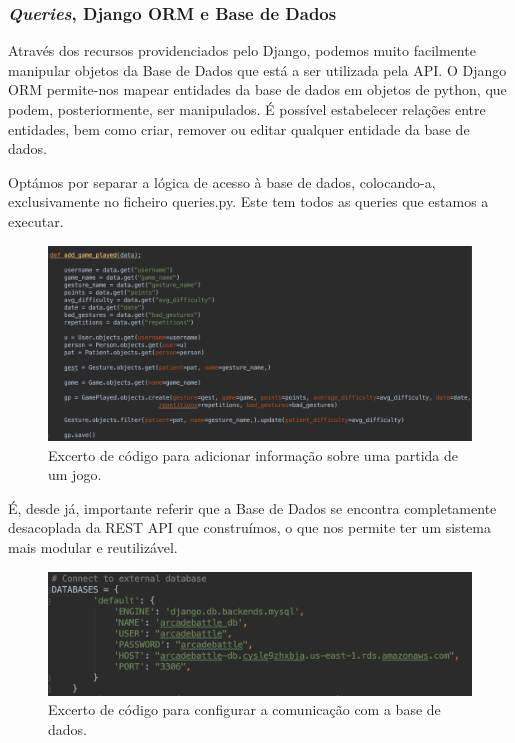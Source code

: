 \documentclass{TTUPhD}
\begin{document}
\subsubsection{\textit{Queries}, Django ORM e Base de Dados}

Através dos recursos providenciados pelo Django, podemos muito facilmente manipular objetos da Base de Dados que está a ser utilizada pela API. O Django ORM permite-nos mapear entidades da base de dados em objetos de python, que podem, posteriormente, ser manipulados. É possível estabelecer relações entre entidades, bem como criar, remover ou editar qualquer entidade da base de dados.

Optámos por separar a lógica de acesso à base de dados, colocando-a, exclusivamente no ficheiro queries.py. Este tem todos as queries que estamos a executar.

\begin{figure}[h!]
    \center
    \includegraphics[scale=0.4]{./img/rest1.png}
    \caption{Excerto de código para adicionar informação sobre uma partida de um jogo.}
    \label{fig:rest1}
\end{figure}

É, desde já, importante referir que a Base de Dados se encontra completamente desacoplada da REST API que construímos, o que nos permite ter um sistema mais modular e reutilizável.

\begin{figure}[h!]
    \center
    \includegraphics[scale=0.58]{./img/rest2.png}
    \caption{Excerto de código para configurar a comunicação com a base de dados.}
    \label{fig:rest2}
\end{figure}
\end{document}
